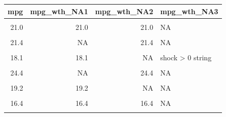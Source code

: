 \documentclass[
]{book}
\newenvironment{Shaded}{\begin{snugshade}}{\end{snugshade}}
\newcommand{\CommentTok}[1]{\textcolor[rgb]{0.56,0.35,0.01}{\textit{#1}}}
\begin{document}
\begin{table}[!h]
\centering
\begin{tabular}{r|r|r|l}
\hline
mpg & mpg\_wth\_NA1 & mpg\_wth\_NA2 & mpg\_wth\_NA3\\
\hline
\cellcolor{gray!6}{21.0} & \cellcolor{gray!6}{NA} & \cellcolor{gray!6}{NA} & \cellcolor{gray!6}{shock > 0 string}\\
\hline
21.0 & 21.0 & 21.0 & NA\\
\hline
\cellcolor{gray!6}{22.8} & \cellcolor{gray!6}{NA} & \cellcolor{gray!6}{NA} & \cellcolor{gray!6}{NA}\\
\hline
21.4 & NA & 21.4 & NA\\
\hline
\cellcolor{gray!6}{18.7} & \cellcolor{gray!6}{NA} & \cellcolor{gray!6}{18.7} & \cellcolor{gray!6}{NA}\\
\hline
18.1 & 18.1 & NA & shock > 0 string\\
\hline
\cellcolor{gray!6}{14.3} & \cellcolor{gray!6}{14.3} & \cellcolor{gray!6}{NA} & \cellcolor{gray!6}{shock > 0 string}\\
\hline
24.4 & NA & 24.4 & NA\\
\hline
\cellcolor{gray!6}{22.8} & \cellcolor{gray!6}{22.8} & \cellcolor{gray!6}{22.8} & \cellcolor{gray!6}{NA}\\
\hline
19.2 & 19.2 & NA & NA\\
\hline
\cellcolor{gray!6}{17.8} & \cellcolor{gray!6}{NA} & \cellcolor{gray!6}{NA} & \cellcolor{gray!6}{NA}\\
\hline
16.4 & 16.4 & 16.4 & NA\\
\hline
\cellcolor{gray!6}{17.3} & \cellcolor{gray!6}{NA} & \cellcolor{gray!6}{NA} & \cellcolor{gray!6}{shock > 0 string}\\
\hline
\end{tabular}
\end{table}

\begin{Shaded}
\end{Shaded}
\end{document}
